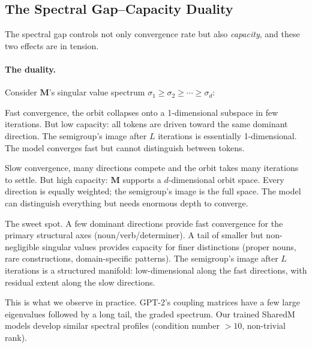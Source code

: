 \documentclass[11pt, a4paper]{article}
\newcommand{\M}{\mathbf{M}}
\theoremstyle{remark}
\begin{document}
\subsection{The Spectral Gap--Capacity Duality}

The spectral gap controls not only convergence rate but also \emph{capacity}, and these two effects are in tension.

\paragraph{The duality.}
Consider $\M$'s singular value spectrum $\sigma_1 \geq \sigma_2 \geq \cdots \geq \sigma_d$:

\begin{description}[nosep]
    \item[Huge gap ($\sigma_1 \gg \sigma_2 \gg \cdots$):]
    Fast convergence, the orbit collapses onto a 1-dimensional subspace in few iterations.
    But low capacity: all tokens are driven toward the same dominant direction.
    The semigroup's image after $L$ iterations is essentially 1-dimensional.
    The model converges fast but cannot distinguish between tokens.

    \item[No gap ($\sigma_1 \approx \sigma_2 \approx \cdots \approx \sigma_d$):]
    Slow convergence, many directions compete and the orbit takes many iterations to settle.
    But high capacity: $\M$ supports a $d$-dimensional orbit space.
    Every direction is equally weighted; the semigroup's image is the full space.
    The model can distinguish everything but needs enormous depth to converge.

    \item[Graded spectrum ($\sigma_1 > \sigma_2 > \cdots$, with a tail):]
    The sweet spot.
    A few dominant directions provide fast convergence for the primary structural axes (noun/verb/determiner).
    A tail of smaller but non-negligible singular values provides capacity for finer distinctions (proper nouns, rare constructions, domain-specific patterns).
    The semigroup's image after $L$ iterations is a structured manifold: low-dimensional along the fast directions, with residual extent along the slow directions.
\end{description}

This is what we observe in practice.
GPT-2's coupling matrices have a few large eigenvalues followed by a long tail, the graded spectrum.
Our trained SharedM models develop similar spectral profiles (condition number $> 10$, non-trivial rank).
\end{document}
